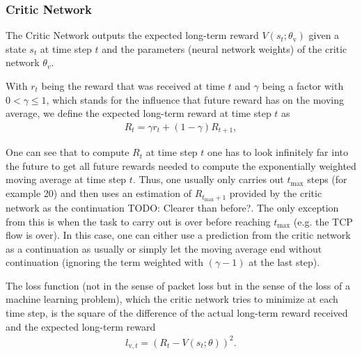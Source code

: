 \documentclass[sigconf]{acmart}
\newcommand\note[2]{{\color{#1}#2}}
\newcommand\todo[1]{{\note{red}{TODO: #1}}}
\begin{document}
\subsubsection{Critic Network}
\label{subsubsec:genericvalue}

The Critic Network outputs the expected long-term reward $V(s_{t}; \theta_\text{v})$ given a state $s_t$ at time step $t$ and the parameters (neural network weights) of the critic network $\theta_v$.

With $r_t$ being the reward that was received at time $t$ and $\gamma$ being a factor with $0 < \gamma \leq 1$, which stands for the influence that future reward has on the moving average, we define the expected long-term reward at time step $t$ as 
\begin{align*}
R_t = \gamma r_{t} + (1-\gamma) R_{t+1} ,
\end{align*}

One can see that to compute $R_t$ at time step $t$ one has to look infinitely far into the future to get all future rewards needed to compute the exponentially weighted moving average at time step $t$. Thus, one usually only carries out $t_\text{max}$ steps (for example 20) and then uses an estimation of $R_{t_\text{max}+1}$ provided by the critic network as the continuation \todo{Clearer than before?}. The only exception from this is when the task to carry out is over before reaching $t_\text{max}$ (e.g. the TCP flow is over). In this case, one can either use a prediction from the critic network as a continuation as usually or simply let the moving average end without continuation (ignoring the term weighted with $(\gamma-1)$ at the last step). 



The loss function (not in the sense of packet loss but in the sense of the loss of a machine learning problem), which the critic network tries to minimize at each time step, is the square of the difference of the actual long-term reward received and the expected long-term reward
\begin{align*}
l_{\text{v},t} = \left(R_t - V(s_t; \theta)\right)^2.
\end{align*}
\end{document}
